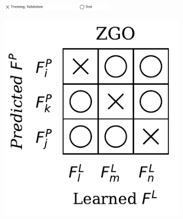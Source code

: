 \begin{definition}[SO/GO in DiagVib-6]
    \begin{figure}[H]
        \centering
        \begin{subfigure}[b]{\textwidth}
            \centering
            \includegraphics[width=0.6\textwidth]{img/datasets/_legend_theory.pdf}
        \end{subfigure}
        \vspace{-0.2cm} %

        \begin{subfigure}[b]{0.17\textwidth}
            \includegraphics[width=\textwidth]{img/datasets/_ZGO.pdf}
        \end{subfigure}
        \hfill
        \begin{subfigure}[b]{0.17\textwidth}

\end{subfigure}
\end{figure}
\end{definition}
